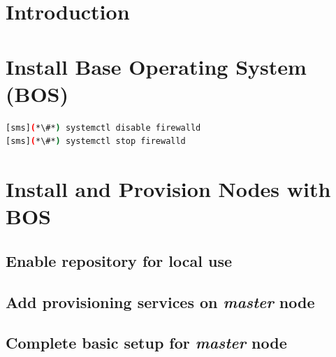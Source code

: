 \documentclass{ohpc-doc}
\begin{document}

\chapter{Introduction} \label{sec:introduction}








\chapter{Install Base Operating System (BOS)}


\begin{lstlisting}[language=bash,keywords={}]
[sms](*\#*) systemctl disable firewalld
[sms](*\#*) systemctl stop firewalld
\end{lstlisting}


\chapter{Install \Confluent{} and Provision Nodes with BOS} \label{sec:provision_compute_bos}


\section{Enable \Confluent{} repository for local use} \label{sec:enable_confluent}


\section{Add provisioning services on {\em master} node} \label{sec:add_provisioning}


\section{Complete basic \Confluent{} setup for {\em master} node} \label{sec:setup_confluent}

\end{document}
